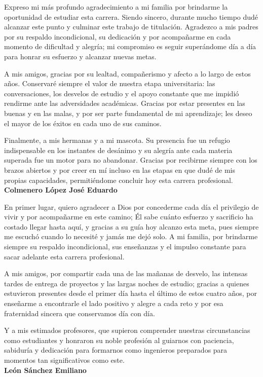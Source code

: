 \begin{agradecimientos}
Expreso mi más profundo agradecimiento a mi familia por brindarme la oportunidad de estudiar esta carrera. Siendo sincero, durante mucho tiempo dudé alcanzar este punto y culminar este trabajo de titulación. Agradezco a mis padres por su respaldo incondicional, su dedicación y por acompañarme en cada momento de dificultad y alegría; mi compromiso es seguir superándome día a día para honrar su esfuerzo y alcanzar nuevas metas.

A mis amigos, gracias por su lealtad, compañerismo y afecto a lo largo de estos años. Conservaré siempre el valor de nuestra etapa universitaria: las conversaciones, los desvelos de estudio y el apoyo constante que me impidió rendirme ante las adversidades académicas. Gracias por estar presentes en las buenas y en las malas, y por ser parte fundamental de mi aprendizaje; les deseo el mayor de los éxitos en cada uno de sus caminos.

Finalmente, a mis hermanas y a mi mascota. Su presencia fue un refugio indispensable en los instantes de desánimo y su alegría ante cada materia superada fue un motor para no abandonar. Gracias por recibirme siempre con los brazos abiertos y por creer en mí incluso en las etapas en que dudé de mis propias capacidades, permitiéndome concluir hoy esta carrera profesional.\\

\textbf{Colmenero López José Eduardo}
\end{agradecimientos}

\begin{agradecimientos}
En primer lugar, quiero agradecer a Dios por concederme cada día el privilegio de vivir y por acompañarme en este camino; Él sabe cuánto esfuerzo y sacrificio ha costado llegar hasta aquí, y gracias a su guía hoy alcanzo esta meta, pues siempre me escuchó cuando lo necesité y jamás me dejó solo. A mi familia, por brindarme siempre su respaldo incondicional, sus enseñanzas y el impulso constante para sacar adelante esta carrera profesional.

A mis amigos, por compartir cada una de las mañanas de desvelo, las intensas tardes de entrega de proyectos y las largas noches de estudio; gracias a quienes estuvieron presentes desde el primer día hasta el último de estos cuatro años, por enseñarme a encontrarle el lado positivo y alegre a cada reto y por esa fraternidad sincera que conservamos día con día.

Y a mis estimados profesores, que supieron comprender nuestras circunstancias como estudiantes y honraron su noble profesión al guiarnos con paciencia, sabiduría y dedicación para formarnos como ingenieros preparados para momentos tan significativos como este.\\

\textbf{León Sánchez Emiliano}
\end{agradecimientos}
